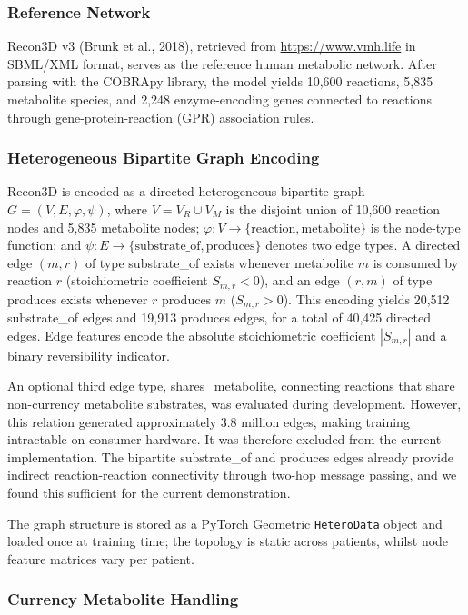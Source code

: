 \documentclass[12pt,a4paper]{article}
\begin{document}
\subsubsection{Reference Network}

Recon3D v3 (Brunk et al., 2018), retrieved from \url{https://www.vmh.life} in SBML/XML format, serves as the reference human metabolic network. After parsing with the COBRApy library, the model yields 10,600 reactions, 5,835 metabolite species, and 2,248 enzyme-encoding genes connected to reactions through gene-protein-reaction (GPR) association rules.

\subsubsection{Heterogeneous Bipartite Graph Encoding}

Recon3D is encoded as a directed heterogeneous bipartite graph $G = (V, E, \varphi, \psi)$, where $V = V_R \cup V_M$ is the disjoint union of 10,600 reaction nodes and 5,835 metabolite nodes; $\varphi\colon V \rightarrow \{\text{reaction}, \text{metabolite}\}$ is the node-type function; and $\psi\colon E \rightarrow \{\text{substrate\_of}, \text{produces}\}$ denotes two edge types. A directed edge $(m, r)$ of type substrate\_of exists whenever metabolite $m$ is consumed by reaction $r$ (stoichiometric coefficient $S_{m,r} < 0$), and an edge $(r, m)$ of type produces exists whenever $r$ produces $m$ ($S_{m,r} > 0$). This encoding yields 20,512 substrate\_of edges and 19,913 produces edges, for a total of 40,425 directed edges. Edge features encode the absolute stoichiometric coefficient $|S_{m,r}|$ and a binary reversibility indicator.

An optional third edge type, shares\_metabolite, connecting reactions that share non-currency metabolite substrates, was evaluated during development. However, this relation generated approximately 3.8 million edges, making training intractable on consumer hardware. It was therefore excluded from the current implementation. The bipartite substrate\_of and produces edges already provide indirect reaction-reaction connectivity through two-hop message passing, and we found this sufficient for the current demonstration.

The graph structure is stored as a PyTorch Geometric \texttt{HeteroData} object and loaded once at training time; the topology is static across patients, whilst node feature matrices vary per patient.

\subsubsection{Currency Metabolite Handling}
\end{document}
